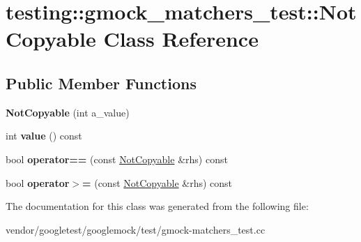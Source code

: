 \hypertarget{classtesting_1_1gmock__matchers__test_1_1_not_copyable}{}\section{testing\+:\+:gmock\+\_\+matchers\+\_\+test\+:\+:Not\+Copyable Class Reference}
\label{classtesting_1_1gmock__matchers__test_1_1_not_copyable}
\subsection*{Public Member Functions}
\begin{DoxyCompactItemize}
\item 
\mbox{\label{classtesting_1_1gmock__matchers__test_1_1_not_copyable_a3d15763c115415a26d8acc9ce5a26e19}} 
{\bfseries Not\+Copyable} (int a\+\_\+value)
\item 
\mbox{\label{classtesting_1_1gmock__matchers__test_1_1_not_copyable_af6c134767462948fa8dbd35c68370004}} 
int {\bfseries value} () const
\item 
\mbox{\label{classtesting_1_1gmock__matchers__test_1_1_not_copyable_a2e68fcd9a588a184d54e6b54e41fb978}} 
bool {\bfseries operator==} (const \mbox{\hyperlink{classtesting_1_1gmock__matchers__test_1_1_not_copyable}{Not\+Copyable}} \&rhs) const
\item 
\mbox{\label{classtesting_1_1gmock__matchers__test_1_1_not_copyable_a36eb6a25f5559bee00fe52a6d86b42d6}} 
bool {\bfseries operator$>$=} (const \mbox{\hyperlink{classtesting_1_1gmock__matchers__test_1_1_not_copyable}{Not\+Copyable}} \&rhs) const
\end{DoxyCompactItemize}


The documentation for this class was generated from the following file\+:\begin{DoxyCompactItemize}
\item 
vendor/googletest/googlemock/test/gmock-\/matchers\+\_\+test.\+cc\end{DoxyCompactItemize}
